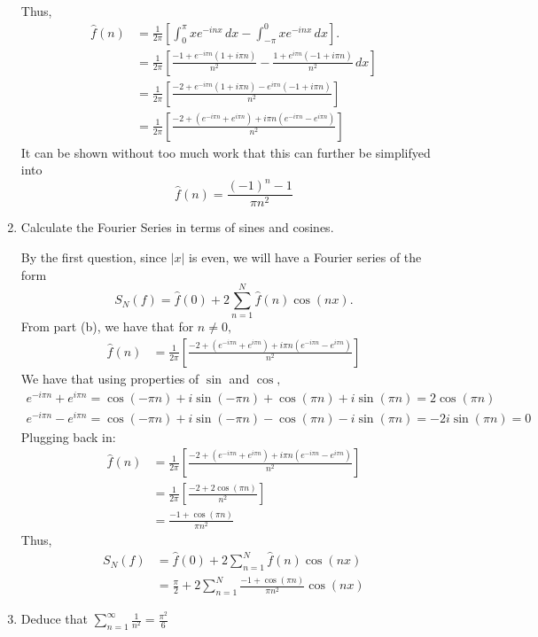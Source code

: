 \documentclass[11pt]{article}
\begin{document}
\begin{problem}
\begin{enumerate}
\begin{solution}
Thus, 
\begin{align*}
    \hat{f}(n) &= \frac{1}{2\pi}\left[\int_0^\pi x e^{-inx}\,dx - \int_{-\pi}^0 x e^{-inx}\, dx\right].\\
    &= \frac{1}{2\pi}\left[\frac{-1 + e^{-i\pi n}(1 + i\pi n)}{n^2} - \frac{1 + e^{i\pi n}(-1 + i\pi n)}{n^2}\, dx\right]\\
    &= \frac{1}{2\pi}\left[\frac{-2 + e^{-i\pi n}(1 + i\pi n) - e^{i\pi n}(-1 + i\pi n)}{n^2}\right]\\
    &= \frac{1}{2\pi}\left[\frac{-2 + (e^{-i\pi n} + e^{ i\pi n}) + i\pi n(e^{-i\pi n} - e^{i\pi n})}{n^2}\right]
\end{align*}
It can be shown without too much work that this can further be simplifyed into 
\[\hat{f}(n) = \frac{(-1)^n - 1}{\pi n^2}\]
        \end{solution}
\item Calculate the Fourier Series in terms of sines and cosines.
\begin{solution}
    By the first question, since $|x|$ is even, we will have a Fourier series of the form 
    \[S_N(f) = \hat{f}(0) + 2\sum_{n=1}^N \hat{f}(n)\cos(nx).\] From part (b), we have that for $n \neq 0,$
    \begin{align*}
        \hat{f}(n) &= \frac{1}{2\pi}\left[\frac{-2 + (e^{-i\pi n} + e^{ i\pi n}) + i\pi n(e^{-i\pi n} - e^{i\pi n})}{n^2}\right]
    \end{align*}
    We have that using properties of $\sin$ and $\cos,$ 
    \begin{align*}
       e^{-i\pi n} + e^{ i\pi n} = \cos(-\pi n) + i\sin(-\pi n) +  \cos(\pi n) + i\sin(\pi n) = 2\cos(\pi n) 
    \end{align*}
    \begin{align*}
        e^{-i\pi n} - e^{ i\pi n} = \cos(-\pi n) + i\sin(-\pi n) - \cos(\pi n) - i\sin(\pi n) = -2i\sin(\pi n) = 0
    \end{align*}
    Plugging back in:
        \begin{align*}
        \hat{f}(n) &= \frac{1}{2\pi}\left[\frac{-2 + (e^{-i\pi n} + e^{ i\pi n}) + i\pi n(e^{-i\pi n} - e^{i\pi n})}{n^2}\right]\\
        \ &= \frac{1}{2\pi}\left[\frac{-2 + 2\cos(\pi n)}{n^2}\right]\\
        &= \frac{-1 + \cos(\pi n)}{\pi n^2}
    \end{align*}
    Thus, 
\begin{align*}
    S_N(f) &= \hat{f}(0) + 2\sum_{n=1}^N \hat{f}(n)\cos(nx)\\
    &= \frac{\pi}{2} + 2\sum_{n=1}^N\frac{-1 + \cos(\pi n)}{\pi n^2} \cos(nx)
\end{align*}
\end{solution}
\item 
Deduce that $\sum_{n=1}^\infty \frac{1}{n^2} = \frac{\pi^2}{6}$
   \begin{solution}
       \begin{lemma}


\end{lemma}
\end{solution}
\end{enumerate}
\end{problem}
\end{document}
